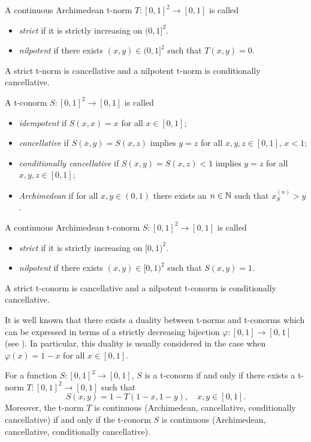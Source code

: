 \begin{definition}  A continuous Archimedean t-norm $T:[0,1]^2 \to [0,1]$ is called	
	\begin{itemize}
		\item \emph{strict} if it is strictly increasing on $(0,1]^2$.
		\item \emph{nilpotent} if there exists $(x,y) \in (0,1]^2$ such that $T(x,y)=0$.
	\end{itemize}
	A strict t-norm is cancellative and a nilpotent t-norm is conditionally cancellative.
\end{definition}

\pagebreak

\begin{definition} A t-conorm $S:[0,1]^2 \to [0,1]$ is called
	\begin{itemize}
		\item \emph{idempotent} if $S(x,x)=x$ for all $x \in [0,1]$;
		\item \emph{cancellative} if $S(x,y)=S(x,z)$ implies $y=z$ for all $x,y,z \in [0,1]$, $x<1$;
		\item \emph{conditionally cancellative} if $S(x,y)=S(x,z)<1$ implies $y=z$ for all $x,y,z \in [0,1]$;
		\item \emph{Archimedean} if for all $x,y \in (0,1)$ there exists an $n \in \mathbb{N}$ such that $x_S^{(n)}>y$.
	\end{itemize}
\end{definition}

\begin{definition}  A continuous Archimedean t-conorm $S:[0,1]^2 \to [0,1]$ is called	
	\begin{itemize}
		\item \emph{strict} if it is strictly increasing on $[0,1)^2$.
		\item \emph{nilpotent} if there exists $(x,y) \in [0,1)^2$ such that $S(x,y)=1$.
	\end{itemize}
	A strict t-conorm is cancellative and a nilpotent t-conorm is conditionally cancellative.
\end{definition}

It is well known that there exists a duality between t-norms and t-conorms which can be expressed in terms of a strictly decreasing bijection $\varphi:[0,1] \to [0,1]$ (see \cite[Proposition 2.34]{Klement2000}). In particular, this duality is usually considered in the case when $\varphi(x)=1-x$ for all $x \in [0,1]$.
\begin{proposition}\label{prop:duality} For a function $S:[0,1]^2 \to [0,1]$, $S$ is a t-conorm if and only if there exists a t-norm $T:[0,1]^2 \to [0,1]$ such that 
	$$S(x,y)=1-T(1-x,1-y), \quad x,y \in [0,1].$$
	Moreover, the t-norm $T$ is continuous (Archimedean, cancellative, conditionally cancellative) if and only if the t-conorm $S$ is continuous (Archimedean, cancellative, conditionally cancellative).	
\end{proposition}


